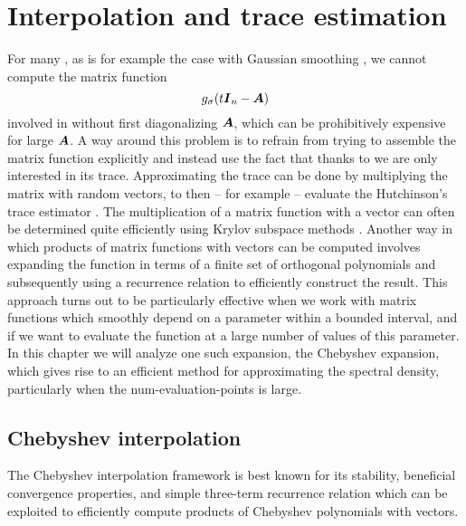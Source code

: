 \chapter{Interpolation and trace estimation}
\label{chp:2-chebyshev}

For many , as is for example the case with Gaussian smoothing
, we cannot compute the matrix function
\begin{equation}
    g_{\sigma}(t\boldsymbol{I}_n - \boldsymbol{A})
    \label{equ:2-chebyshev-matrix-function}
\end{equation}
involved in  without first
diagonalizing $\boldsymbol{A}$, which can be prohibitively expensive for large
$\boldsymbol{A}$. A way around this problem is to refrain from trying to assemble the
matrix function explicitly and instead use the fact that thanks to
 we are only interested
in its trace. Approximating the trace can be done by multiplying the matrix
with random vectors, to then -- for example -- evaluate the Hutchinson's trace estimator \cite{hutchinson1990trace}.
The multiplication of a matrix function with a vector can
often be determined quite efficiently using Krylov subspace methods
\cite[chapter~13.2]{higham2008functions}. Another way in which products of matrix
functions with vectors can be computed involves
expanding the function in terms of a finite set of orthogonal polynomials
and subsequently using a recurrence relation to efficiently construct the result.
This approach turns out to be particularly effective when we work with matrix
functions which smoothly depend on a parameter within a bounded interval, and if we
want to evaluate the function at a large number of values of this parameter.
In this chapter we will analyze one such expansion, the Chebyshev expansion,
which gives rise to an efficient method for approximating the spectral density,
particularly when the \gls{num-evaluation-points} is large.


\section{Chebyshev interpolation}
\label{sec:2-chebyshev-interpolation}

The Chebyshev interpolation framework is best known for its stability, beneficial
convergence properties, and simple three-term recurrence relation
 which can
be exploited to efficiently compute products of Chebyshev polynomials with
vectors.\\

